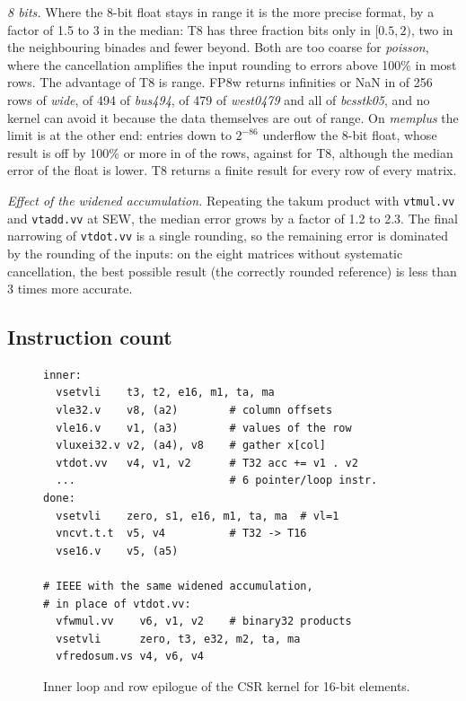\documentclass[conference]{IEEEtran}
\newcommand{\code}[1]{\texttt{#1}}
\begin{document}
\emph{8 bits.} Where the 8-bit float stays in range it is the more precise format, by a factor of 1.5 to
3 in the median: T8 has three fraction bits only in $[0.5,2)$, two in the neighbouring binades and fewer
beyond. Both are too coarse for \emph{poisson}, where the cancellation amplifies the input rounding to
errors above 100\% in most rows. The advantage of T8 is range. FP8w returns infinities or NaN in
\FPEIGHTBAD{} of 256 rows of \emph{wide}, \NFBUS{} of 494 of \emph{bus494}, \NFWEST{} of 479 of
\emph{west0479} and all \NFBCS{} of \emph{bcsstk05}, and no kernel can avoid it because the data
themselves are out of range. On \emph{memplus} the limit is at the other end: entries down to $2^{-86}$
underflow the 8-bit float, whose result is off by 100\% or more in \MEMFEBAD{} of the \MEMROWS{} rows,
against \MEMTEBAD{} for T8, although the median error of the float is lower. T8 returns a finite result for every row of
every matrix.

\emph{Effect of the widened accumulation.} Repeating the takum product with \code{vtmul.vv} and
\code{vtadd.vv} at SEW, the median error grows by a factor of 1.2 to 2.3. The final narrowing of
\code{vtdot.vv} is a single rounding, so the remaining error is dominated by the rounding of the inputs:
on the eight matrices without systematic cancellation, the best possible result (the correctly rounded
reference) is less than 3 times more accurate.

\subsection{Instruction count}

\begin{figure}[t]
\footnotesize
\begin{verbatim}
inner:
  vsetvli    t3, t2, e16, m1, ta, ma
  vle32.v    v8, (a2)        # column offsets
  vle16.v    v1, (a3)        # values of the row
  vluxei32.v v2, (a4), v8    # gather x[col]
  vtdot.vv   v4, v1, v2      # T32 acc += v1 . v2
  ...                        # 6 pointer/loop instr.
done:
  vsetvli    zero, s1, e16, m1, ta, ma  # vl=1
  vncvt.t.t  v5, v4          # T32 -> T16
  vse16.v    v5, (a5)

# IEEE with the same widened accumulation,
# in place of vtdot.vv:
  vfwmul.vv    v6, v1, v2    # binary32 products
  vsetvli      zero, t3, e32, m2, ta, ma
  vfredosum.vs v4, v6, v4
\end{verbatim}
\caption{Inner loop and row epilogue of the CSR kernel for 16-bit elements.}
\label{fig:asm}
\end{figure}
\end{document}
